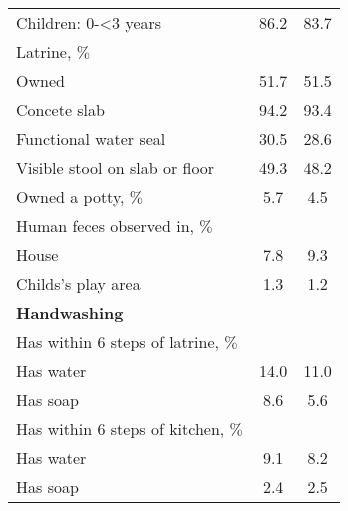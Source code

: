 \documentclass[11pt, nogin]{article}
\begin{document}
\begin{table}[!ht]
\begin{center}
\begin{tabular}{@{\extracolsep{4pt}}l c c }
  \hspace{6mm}Children: 0-<3 years & 86.2 & 83.7 \\ 
  \hspace{3mm}Latrine, $\%$ &  &  \\ 
  \hspace{6mm}Owned & 51.7 & 51.5 \\ 
  \hspace{6mm}Concete slab & 94.2 & 93.4 \\ 
  \hspace{6mm}Functional water seal & 30.5 & 28.6 \\ 
  \hspace{6mm}Visible stool on slab or floor & 49.3 & 48.2 \\ 
  \hspace{3mm}Owned a potty, $\%$ & 5.7 & 4.5 \\ 
  \hspace{3mm}Human feces observed in, $\%$ &  &  \\ 
  \hspace{6mm}House & 7.8 & 9.3 \\ 
  \hspace{6mm}Childs's play area & 1.3 & 1.2 \\ 
  \textbf{Handwashing} &  &  \\ 
  \hspace{3mm}Has within 6 steps of latrine, $\%$ &  &  \\ 
  \hspace{6mm}Has water & 14.0 & 11.0 \\ 
  \hspace{6mm}Has soap & 8.6 & 5.6 \\ 
  \hspace{3mm}Has within 6 steps of kitchen, $\%$ &  &  \\ 
  \hspace{6mm}Has water & 9.1 & 8.2 \\ 
  \hspace{6mm}Has soap & 2.4 & 2.5 \\ \hline
\end{tabular}
\begin{scriptsize}
\begin{spacing}{1.0}

\end{spacing}
\end{scriptsize}
\end{center}
\end{table}

\FloatBarrier

\end{document}
